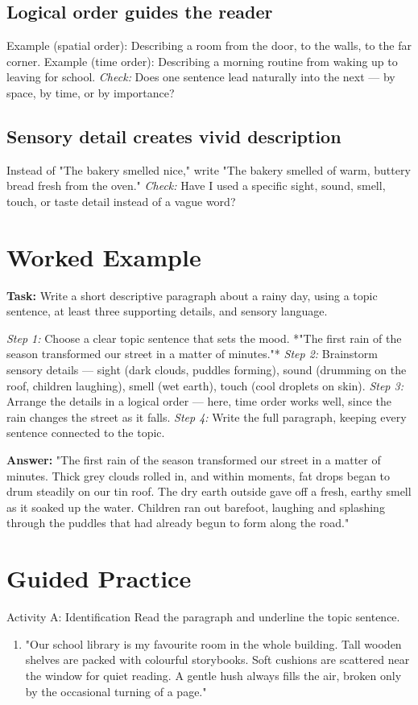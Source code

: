 \subsection*{Logical order guides the reader}
Example (spatial order): Describing a room from the door, to the walls, to the far corner.
Example (time order): Describing a morning routine from waking up to leaving for school.
\textit{Check:} Does one sentence lead naturally into the next — by space, by time, or by importance?

\subsection*{Sensory detail creates vivid description}
Instead of "The bakery smelled nice," write "The bakery smelled of warm, buttery bread fresh from the oven." \textit{Check:} Have I used a specific sight, sound, smell, touch, or taste detail instead of a vague word?

\section{Worked Example}
\begin{examplebox}
\textbf{Task:} Write a short descriptive paragraph about a rainy day, using a topic sentence, at least three supporting details, and sensory language.

\textit{Step 1:} Choose a clear topic sentence that sets the mood. *"The first rain of the season transformed our street in a matter of minutes."*
\textit{Step 2:} Brainstorm sensory details — sight (dark clouds, puddles forming), sound (drumming on the roof, children laughing), smell (wet earth), touch (cool droplets on skin).
\textit{Step 3:} Arrange the details in a logical order — here, time order works well, since the rain changes the street as it falls.
\textit{Step 4:} Write the full paragraph, keeping every sentence connected to the topic.

\textbf{Answer:} "The first rain of the season transformed our street in a matter of minutes. Thick grey clouds rolled in, and within moments, fat drops began to drum steadily on our tin roof. The dry earth outside gave off a fresh, earthy smell as it soaked up the water. Children ran out barefoot, laughing and splashing through the puddles that had already begun to form along the road."
\end{examplebox}

\section{Guided Practice}
\begin{activitybox}{Activity A: Identification}
Read the paragraph and underline the topic sentence.
\begin{enumerate}
    \item "Our school library is my favourite room in the whole building. Tall wooden shelves are packed with colourful storybooks. Soft cushions are scattered near the window for quiet reading. A gentle hush always fills the air, broken only by the occasional turning of a page."
\end{enumerate}
\end{activitybox}

